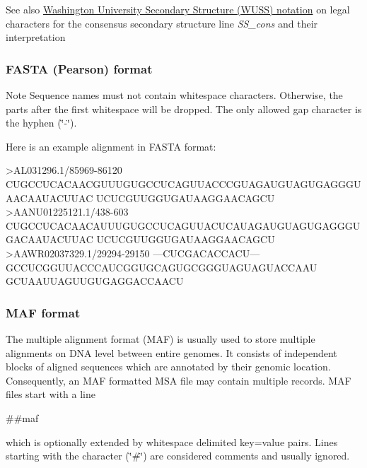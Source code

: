 \begin{DoxySeeAlso}{See also}
\hyperlink{rna_structure_notations_wuss-notation}{Washington University Secondary Structure (W\+U\+SS) notation} on legal characters for the consensus secondary structure line {\itshape S\+S\+\_\+cons} and their interpretation
\end{DoxySeeAlso}
\hypertarget{file_formats_msa-formats-fasta}{}\subsubsection{F\+A\+S\+T\+A (\+Pearson) format}\label{file_formats_msa-formats-fasta}
\begin{DoxyNote}{Note}
Sequence names must not contain whitespace characters. Otherwise, the parts after the first whitespace will be dropped. The only allowed gap character is the hyphen {\itshape }(\char`\"{}-\/\char`\"{}).
\end{DoxyNote}
Here is an example alignment in F\+A\+S\+TA format\+: 
\begin{DoxyVerbInclude}
>AL031296.1/85969-86120
CUGCCUCACAACGUUUGUGCCUCAGUUACCCGUAGAUGUAGUGAGGGUAACAAUACUUAC
UCUCGUUGGUGAUAAGGAACAGCU
>AANU01225121.1/438-603
CUGCCUCACAACAUUUGUGCCUCAGUUACUCAUAGAUGUAGUGAGGGUGACAAUACUUAC
UCUCGUUGGUGAUAAGGAACAGCU
>AAWR02037329.1/29294-29150
---CUCGACACCACU---GCCUCGGUUACCCAUCGGUGCAGUGCGGGUAGUAGUACCAAU
GCUAAUUAGUUGUGAGGACCAACU
\end{DoxyVerbInclude}
\hypertarget{file_formats_msa-formats-maf}{}\subsubsection{M\+A\+F format}\label{file_formats_msa-formats-maf}
The multiple alignment format (M\+AF) is usually used to store multiple alignments on D\+NA level between entire genomes. It consists of independent blocks of aligned sequences which are annotated by their genomic location. Consequently, an M\+AF formatted M\+SA file may contain multiple records. M\+AF files start with a line \begin{DoxyVerb}##maf
\end{DoxyVerb}
 which is optionally extended by whitespace delimited key=value pairs. Lines starting with the character (\char`\"{}\#\char`\"{}) are considered comments and usually ignored.

